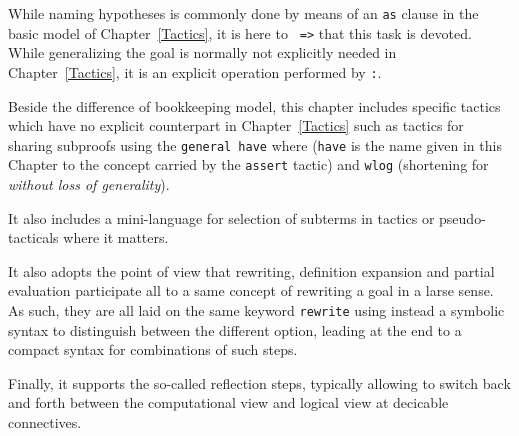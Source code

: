 While naming hypotheses is commonly done by means of an {\tt as}
clause in the basic model of Chapter~\ref{Tactics}, it is here to {\tt
=>} that this task is devoted. While generalizing the goal is normally
not explicitly needed in Chapter~\ref{Tactics}, it is an explicit
operation performed by {\tt :}.

Beside the difference of bookkeeping model, this chapter includes
specific tactics which have no explicit counterpart in
Chapter~\ref{Tactics} such as tactics for sharing subproofs using the
{\tt general have} where ({\tt have} is the name given in this Chapter
to the concept carried by the {\tt assert} tactic) and {\tt wlog}
(shortening for {\em without loss of generality}).

It also includes a mini-language for selection of subterms in tactics
or pseudo-tacticals where it matters.

It also adopts the point of view that rewriting, definition
expansion and partial evaluation participate all to a same concept of
rewriting a goal in a larse sense. As such, they are all laid on the
same keyword {\tt rewrite} using instead a symbolic syntax to
distinguish between the different option, leading at the end to a
compact syntax for combinations of such steps.

Finally, it supports the so-called reflection steps, typically
allowing to switch back and forth between the computational view and
logical view at decicable connectives. %

\iffalse
\subsection*{How to read this documentation}

The syntax of the tactics is presented as follows:
\begin{itemize}
\item \ssrC{terminals} are in typewriter font and \ssrN{non terminals} are
  between angle brackets.
\item Optional parts of the grammar are surrounded by \optional{ }
  brackets. These should not be confused with verbatim brackets
  \ssrC{[ ]}, which are delimiters in the \ssr{} syntax.
\item A vertical rule {\optsep} indicates an alternative in the syntax, and
  should not be confused with a
  verbatim vertical rule between verbatim brackets \ssrC{[ | ]}.
\item A non empty list of non terminals (at least one item should be
  present) is represented by \ssrN{non terminals}$^+$. A possibly empty
  one is represented by \ssrN{non terminals}$^*$.
\item In a non empty list of non terminals, items are separated by blanks.
\end{itemize}
\fi

